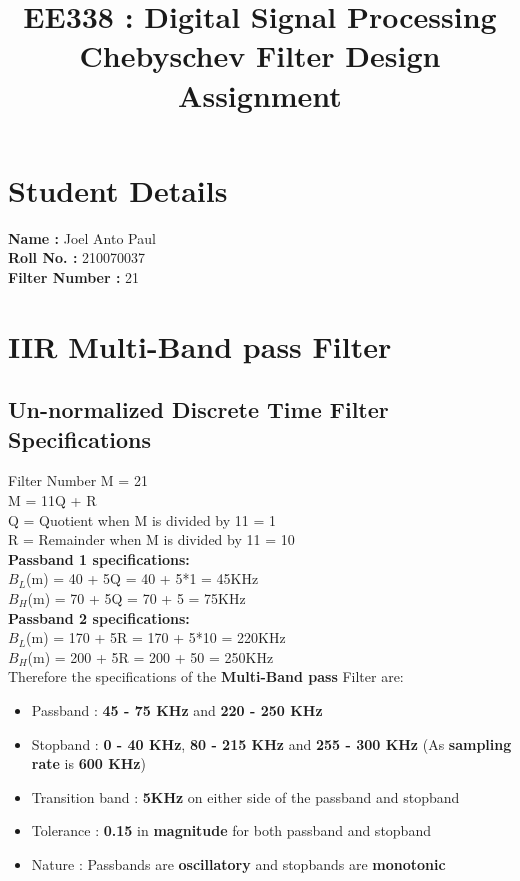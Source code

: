 \documentclass{article}
\title{EE338 : Digital Signal Processing \\ Chebyschev Filter Design Assignment}
\date{}
\begin{document}
\maketitle

\section{\textbf{Student Details}}
\textbf{Name : }Joel Anto Paul\\
\textbf{Roll No. : }210070037\\
\textbf{Filter Number : }21

\section{\textbf{IIR Multi-Band pass Filter}}
\subsection{\textbf{Un-normalized Discrete Time Filter Specifications}}
Filter Number M = 21\\
M = 11Q + R\\
Q = Quotient when M is divided by 11 = 1\\
R = Remainder when M is divided by 11 = 10\\
\textbf{Passband 1 specifications:} \\
$B_L$(m) = 40 + 5Q = 40 + 5*1 = 45KHz \\
$B_H$(m) = 70 + 5Q = 70 + 5 = 75KHz\\
\textbf{Passband 2 specifications:}\\
$B_L$(m) = 170 + 5R = 170 + 5*10 = 220KHz \\
$B_H$(m) = 200 + 5R = 200 + 50 = 250KHz\\
\noindent
Therefore the specifications of the \textbf{Multi-Band pass} Filter are:
\begin{itemize}
    \item Passband : \textbf{45 - 75 KHz} and \textbf{220 - 250 KHz} 
    \item Stopband : \textbf{0 - 40 KHz}, \textbf{80 - 215 KHz} and \textbf{255 - 300 KHz} (As \textbf{sampling rate} is \textbf{600 KHz})
    \item  Transition band : \textbf{5KHz} on either side of the passband and stopband
    \item  Tolerance : \textbf{0.15} in \textbf{magnitude} for both passband and stopband
    \item  Nature : Passbands are \textbf{oscillatory} and stopbands are \textbf{monotonic}
\end{itemize}
\end{document}

